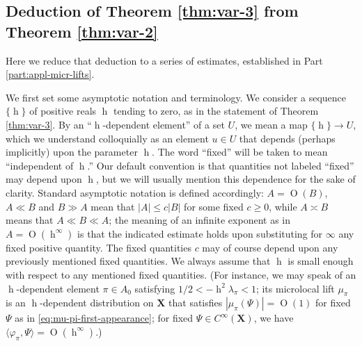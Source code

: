 \documentclass[reqno,10pt]{amsart}
\theoremstyle{plain} %
\theoremstyle{definition}
\theoremstyle{plain} %
\theoremstyle{remark}
\theoremstyle{itplain} %
\theoremstyle{remark} %
\renewcommand{\geq}{\geqslant}
\renewcommand{\leq}{\leqslant}
\numberwithin{equation}{section}
\def\O{\operatorname{O}}
\DeclareMathOperator{\h}{h}
\begin{document}
\subsection{Deduction of Theorem \ref{thm:var-3} from Theorem \ref{thm:var-2}}\label{sec:sketch-deduct-theor}
Here we reduce  that deduction to a series of estimates, established in Part \ref{part:appl-micr-lifts}.  

We first set some asymptotic notation and terminology.  We consider a sequence $\{\h\}$ of positive reals $\h$ tending to zero, as in the statement of Theorem \ref{thm:var-3}.  By an ``$\h$-dependent element'' of a set $U$, we mean a map $\{\h\} \rightarrow U$, which we understand colloquially as an element $u \in U$ that depends (perhaps implicitly) upon the parameter $\h$.  The word ``fixed'' will be taken to mean ``independent of $\h$.''  Our default convention is that quantities not labeled ``fixed'' may depend upon $\h$, but we will usually mention this dependence for the sake of clarity.  Standard asymptotic notation is defined accordingly: $A = \O(B)$, $A \ll B$ and $B \gg A$ mean that $|A| \leq c |B|$ for some fixed $c \geq 0$, while $A \asymp B$ means that $A \ll B \ll A$; the meaning of an infinite exponent as in $A = \O(\h^\infty)$ is that the indicated estimate holds upon substituting for $\infty$ any fixed positive quantity.  The fixed quantities $c$ may of course depend upon any previously mentioned fixed quantities.  We always assume that $\h$ is small enough with respect to any mentioned fixed quantities.  (For instance, we may speak of an $\h$-dependent element $\pi \in A_0$ satisfying $1/2 < -\h^2 \lambda_\pi < 1$; its microlocal lift $\mu_\pi$ is an $\h$-dependent distribution on $\mathbf{X}$ that satisfies $|\mu_\pi(\Psi)| = \O(1)$ for fixed $\Psi$ as in \eqref{eq:mu-pi-first-appearance}; for fixed $\Psi \in C^\infty(\mathbf{X})$, we have $\langle \varphi_\pi, \Psi \rangle = \O(\h^\infty)$.)
\end{document}

